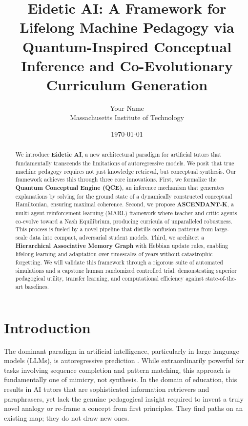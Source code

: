 \documentclass[11pt, letterpaper]{article}
\title{\textbf{Eidetic AI: A Framework for Lifelong Machine Pedagogy via Quantum-Inspired Conceptual Inference and Co-Evolutionary Curriculum Generation}}
\author{Your Name \\ Massachusetts Institute of Technology}
\date{\today}
\begin{document}
\maketitle

\begin{abstract}
\noindent We introduce \textbf{Eidetic AI}, a new architectural paradigm for artificial tutors that fundamentally transcends the limitations of autoregressive models. We posit that true machine pedagogy requires not just knowledge retrieval, but conceptual synthesis. Our framework achieves this through three core innovations. First, we formalize the \textbf{Quantum Conceptual Engine (QCE)}, an inference mechanism that generates explanations by solving for the ground state of a dynamically constructed conceptual Hamiltonian, ensuring maximal coherence. Second, we propose \textbf{ASCENDANT-K}, a multi-agent reinforcement learning (MARL) framework where teacher and critic agents co-evolve toward a Nash Equilibrium, producing curricula of unparalleled robustness. This process is fueled by a novel pipeline that distills confusion patterns from large-scale data into compact, adversarial student models. Third, we architect a \textbf{Hierarchical Associative Memory Graph} with Hebbian update rules, enabling lifelong learning and adaptation over timescales of years without catastrophic forgetting. We will validate this framework through a rigorous suite of automated simulations and a capstone human randomized controlled trial, demonstrating superior pedagogical utility, transfer learning, and computational efficiency against state-of-the-art baselines.
\end{abstract}

\tableofcontents
\newpage

\section{Introduction}
The dominant paradigm in artificial intelligence, particularly in large language models (LLMs), is autoregressive prediction \cite{vaswani2017attention}. While extraordinarily powerful for tasks involving sequence completion and pattern matching, this approach is fundamentally one of mimicry, not synthesis. In the domain of education, this results in AI tutors that are sophisticated information retrievers and paraphrasers, yet lack the genuine pedagogical insight required to invent a truly novel analogy or re-frame a concept from first principles. They find paths on an existing map; they do not draw new ones.
\end{document}
